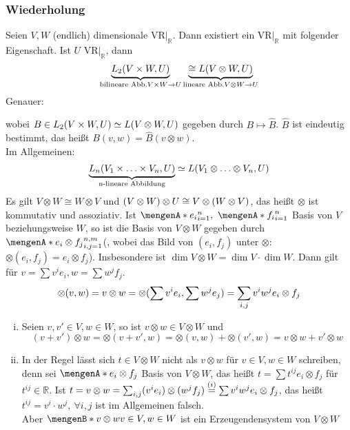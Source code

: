 \subsubsection[Wiederholung:Tensorprodukt von Vektorräumen]{Wiederholung}
\label{ssub:170}
Seien $V,W$ (endlich) dimensionale VR$\vert_{\mathds{R}}$. Dann existiert ein VR$\vert_{\mathds{R}}$ mit folgender Eigenschaft. Ist $U$ VR$\vert_{\mathds{R}}$, dann
\[
\underbrace{L_2(V\times W, U)}_{\text{bilineare Abb.} V\times W\to U} \underbrace{\cong L(V\otimes W, U)}_{\text{lineare Abb.}V\otimes W \to U}
\]
Genauer:
\begin{figure}[H]
\end{figure}
wobei $B\in L_2(V\times W, U) \simeq L (V\otimes W, U)$ gegeben durch $B\mapsto \hat{B}$. $\hat{B}$ ist eindeutig bestimmt, das heißt $B(v,w) = \hat{B}(v\otimes w)$.\\
Im Allgemeinen:
\[
\underbrace{L_n(V_1\times \ldots \times V_n, U)}_{\text{n-lineare Abbildung}} \simeq L(V_1\otimes \ldots \otimes V_n, U)
\]
Es gilt $V\otimes W\cong W\otimes V$ und $(V\otimes W) \otimes U \cong V\otimes (W\otimes V)$, das heißt $\otimes$ ist kommutativ und assoziativ. 
 Ist $\set{e_i}_{i = 1}^n,\ \set{f_i}_{i = 1}^n$ Basis von $V$ beziehungsweise $W$, so ist die Basis von $V\otimes W$ gegeben durch $\set{e_i\otimes f_j}_{i,j = 1}^{n,m}$(, wobei das Bild von $(e_i,f_j)$ unter $\otimes$: $\otimes(e_i,f_j) = e_i \otimes f_j$). Insbesondere ist $\dim V\otimes W = \dim V \cdot \dim W$. Dann gilt für $v = \sum v^i e_i,w = \sum w^j f_j$.
\[
\otimes(v,w) = v\otimes w = \otimes(\sum v^i e_i, \sum w^j e_j) = \sum_{i,j} v^i w^j e_i\otimes f_j
\]
\begin{enumerate}[(i)]
\item Seien $v,v'\in V, w\in W$, so ist $v\otimes w\in V\otimes W$ und 
\[
(v+v')\otimes w = \otimes (v+v',w) = \otimes (v,w) + \otimes (v',w) = v\otimes w + v'\otimes w
\]
\item In der Regel lässt sich $t\in V\otimes W$ nicht als $v\otimes w$ für $v\in V,w\in W$ schreiben, denn sei $\set{e_i\otimes f_j}$ Basis von $V\otimes W$, das heißt $t = \sum t^{ij} e_i\otimes f_j$ für $t^{ij}\in \mathds{R}$. Ist $t = v\otimes w = \sum_{i,j} (v^i e_i)\otimes (w^j f_j) \overset{(i)}{=} \sum v^i w^j e_i\otimes f_j$, das heißt $t^{ij} = v^i\cdot w^j,\ \forall i,j$ ist im Allgemeinen falsch.\\
Aber $\set[v\otimes w]{v\in V, w\in W}$ ist ein Erzeugendensystem von $V\otimes W$
\end{enumerate}

